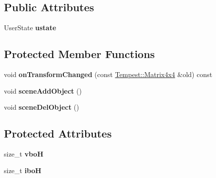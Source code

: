 \subsection*{Public Attributes}
\begin{DoxyCompactItemize}
\item 
\hypertarget{class_tempest_1_1_abstract_graphic_object_ac61fe0a9d5ea96b84ec464cc55ed04d0}{User\+State {\bfseries ustate}}\label{class_tempest_1_1_abstract_graphic_object_ac61fe0a9d5ea96b84ec464cc55ed04d0}

\end{DoxyCompactItemize}
\subsection*{Protected Member Functions}
\begin{DoxyCompactItemize}
\item 
\hypertarget{class_tempest_1_1_abstract_graphic_object_a932cbe1227d8754a1dfc546bf57d8343}{void {\bfseries on\+Transform\+Changed} (const \hyperlink{class_tempest_1_1_matrix4x4}{Tempest\+::\+Matrix4x4} \&old) const }\label{class_tempest_1_1_abstract_graphic_object_a932cbe1227d8754a1dfc546bf57d8343}

\item 
\hypertarget{class_tempest_1_1_abstract_graphic_object_aa8d994901120ee60521c24c2c7704ae5}{void {\bfseries scene\+Add\+Object} ()}\label{class_tempest_1_1_abstract_graphic_object_aa8d994901120ee60521c24c2c7704ae5}

\item 
\hypertarget{class_tempest_1_1_abstract_graphic_object_ad5f01aa4298c43d8faf409ebbef87aa3}{void {\bfseries scene\+Del\+Object} ()}\label{class_tempest_1_1_abstract_graphic_object_ad5f01aa4298c43d8faf409ebbef87aa3}

\end{DoxyCompactItemize}
\subsection*{Protected Attributes}
\begin{DoxyCompactItemize}
\item 
\hypertarget{class_tempest_1_1_abstract_graphic_object_a366e8dcc8e359e69eaa95d571fbd71c6}{size\+\_\+t {\bfseries vbo\+H}}\label{class_tempest_1_1_abstract_graphic_object_a366e8dcc8e359e69eaa95d571fbd71c6}

\item 
\hypertarget{class_tempest_1_1_abstract_graphic_object_a3539f6eb9d00dc6d11cabde984cdc5d0}{size\+\_\+t {\bfseries ibo\+H}}\label{class_tempest_1_1_abstract_graphic_object_a3539f6eb9d00dc6d11cabde984cdc5d0}

\end{DoxyCompactItemize}
